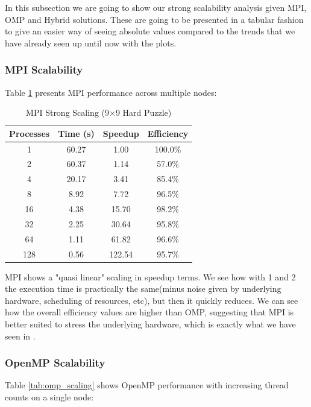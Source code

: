 In this subsection we are going to show our strong scalability analysis given MPI, OMP and Hybrid solutions. These are going to be presented in a tabular fashion to give an easier way of seeing absolute values compared to the trends that we have already seen up until now with the plots.

\subsubsection{MPI Scalability}
\label{subsubsec:mpi_scalability}
Table \ref{tab:mpi_scaling} presents MPI performance across multiple nodes:

\begin{table}[htbp]
\caption{MPI Strong Scaling (9×9 Hard Puzzle)}
\begin{center}
\begin{tabular}{@{}cccc@{}}
\toprule
\textbf{Processes} & \textbf{Time (s)} & \textbf{Speedup} & \textbf{Efficiency} \\
\midrule
1   & 60.27 & 1.00   & 100.0\% \\
2   & 60.37 & 1.14   & 57.0\% \\
4   & 20.17 & 3.41   & 85.4\% \\
8   & 8.92  & 7.72   & 96.5\% \\
16  & 4.38  & 15.70  & 98.2\% \\
32  & 2.25  & 30.64  & 95.8\% \\
64  & 1.11  & 61.82  & 96.6\% \\
128 & 0.56  & 122.54 & 95.7\% \\
\bottomrule
\end{tabular}
\end{center}
\label{tab:mpi_scaling}
\end{table}


MPI shows a "quasi linear" scaling in speedup terms. We see how with 1 and 2 the execution time is practically the same(minus noise given by underlying hardware, scheduling of resources, etc), but then it quickly reduces. We can see how the overall efficiency values are higher than OMP, suggesting that MPI is better suited to stress the underlying hardware, which is exactly what we have seen in .

\subsubsection{OpenMP Scalability}
\label{subsubsec:omp_scalability}
Table \ref{tab:omp_scaling} shows OpenMP performance with increasing thread counts on a single node:

